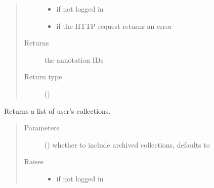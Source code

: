 \documentclass[letterpaper,10pt,english]{sphinxmanual}
\begin{document}
\begin{fulllineitems}
\begin{fulllineitems}
\begin{quote}
\begin{description}
\begin{itemize}
\item {} 
{\hyperref[\detokenize{autoapi/pine/client/exceptions/index:pine.client.exceptions.PineClientAuthException}]{}} \textendash{} if not logged in

\item {} 
{\hyperref[\detokenize{autoapi/pine/client/exceptions/index:pine.client.exceptions.PineClientHttpException}]{}} \textendash{} if the HTTP request returns an error

\end{itemize}

\item[{Returns}] \leavevmode
the annotation IDs

\item[{Return type}] \leavevmode
{}()

\end{description}\end{quote}

\end{fulllineitems}


\begin{fulllineitems}
\label{\detokenize{autoapi/pine/client/index:pine.client.PineClient.list_collections}}
Returns a list of user’s collections.
\begin{quote}\begin{description}
\item[{Parameters}] \leavevmode
{} () \textendash{} whether to include archived collections, defaults to 

\item[{Raises}] \leavevmode\begin{itemize}
\item {} 
{\hyperref[\detokenize{autoapi/pine/client/exceptions/index:pine.client.exceptions.PineClientAuthException}]{}} \textendash{} if not logged in


\end{itemize}
\end{description}
\end{quote}
\end{fulllineitems}
\end{fulllineitems}
\end{document}
